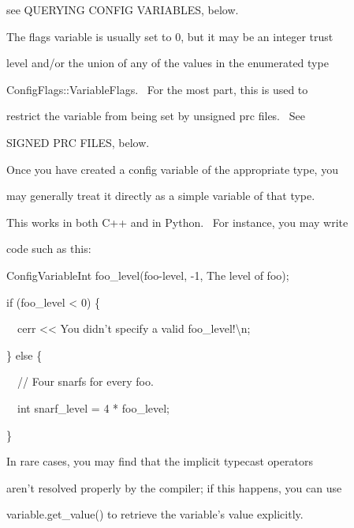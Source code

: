 \documentclass[a4paper]{article}
\begin{document}
{\color{black}
see QUERYING CONFIG VARIABLES, below.}


\bigskip

{\color{black}
The flags variable is usually set to 0, but it may be an integer trust}

{\color{black}
level and/or the union of any of the values in the enumerated type}

{\color{black}
ConfigFlags::VariableFlags. \ For the most part, this is used to}

{\color{black}
restrict the variable from being set by unsigned prc files. \ See}

{\color{black}
SIGNED PRC FILES, below.}


\bigskip

{\color{black}
Once you have created a config variable of the appropriate type, you}

{\color{black}
may generally treat it directly as a simple variable of that type.}

{\color{black}
This works in both C++ and in Python. \ For instance, you may write}

{\color{black}
code such as this:}


\bigskip

{\color{black}
ConfigVariableInt foo\_level({\textquotedbl}foo-level{\textquotedbl}, -1, {\textquotedbl}The level of
foo{\textquotedbl});}


\bigskip

{\color{black}
if (foo\_level {\textless} 0) \{}

{\color{black}
\ \ cerr {\textless}{\textless} {\textquotedbl}You didn't specify a valid foo\_level!{\textbackslash}n{\textquotedbl};}


\bigskip

{\color{black}
\} else \{}

{\color{black}
\ \ // Four snarfs for every foo.}

{\color{black}
\ \ int snarf\_level = 4 * foo\_level;}

{\color{black}
\}}


\bigskip

{\color{black}
In rare cases, you may find that the implicit typecast operators}

{\color{black}
aren't resolved properly by the compiler; if this happens, you can use}

{\color{black}
variable.get\_value() to retrieve the variable's value explicitly.}


\bigskip
\end{document}
